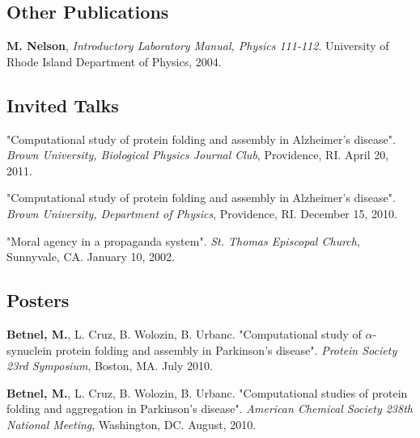 \documentclass[letterpaper]{article}
\renewenvironment{itemize}{
  \begin{list}{}{
    \setlength{\leftmargin}{1em}
  }
}{
  \end{list}
}
\begin{document}
\subsection*{Other Publications}
\begin{itemize}
	\item \textbf{M. Nelson}, \emph{Introductory Laboratory Manual, Physics 111-112}.  University of Rhode Island Department of Physics,  2004.
\end{itemize}

\subsection*{Invited Talks}
\begin{itemize}
	\item  "Computational study of protein folding and assembly in
          Alzheimer's disease". \emph{Brown University, Biological Physics
          Journal Club}, Providence, RI. April 20, 2011.
	\item  "Computational study of protein folding and assembly in
          Alzheimer's disease". \emph{Brown University, Department of
            Physics}, Providence, RI. December 15, 2010.
          \item  "Moral agency in a propaganda system". \emph{St. Thomas Episcopal Church}, Sunnyvale,
            CA. January 10, 2002.
\end{itemize}



\subsection*{Posters}
\begin{itemize}
	\item \textbf{Betnel, M.}, L. Cruz, B. Wolozin, B. Urbanc.  
	"Computational study of $\alpha$-synuclein protein folding and assembly in Parkinson's disease". \emph{Protein Society 23rd Symposium}, Boston, MA.  July 2010.
	\item \textbf{Betnel, M.}, L. Cruz, B. Wolozin, B. Urbanc.  
	"Computational studies of protein folding and aggregation in Parkinson's 
	disease". \emph{American Chemical Society 238th National Meeting}, Washington, DC.  August, 2010.
\end{itemize}
\end{document}

